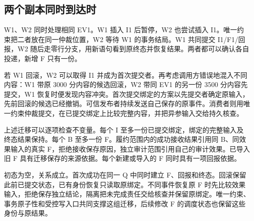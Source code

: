 
\subsection*{两个副本同时到达时}

W1、W2 同时处理相同 EV1。W1 插入 I1 后暂停，W2 也尝试插入 I1。唯一约束把二者放在同一仲裁位置，W2 等待 W1 的事务结局。W1 共同提交 I1/F1/回报，W2 随后走零行分支，用新语句看到原终态并恢复结果。两者都可以确认各自投递，新增 F 只有一份。

若 W1 回滚，W2 可以取得 I1 并成为首次提交者。再考虑调用方错误地混入不同内容：W1 带原 3000 分内容的候选回滚，W2 带同 EV1 的另一份 3500 分内容先提交，W1 恢复时便发现内容冲突。首次提交绑定的方案以先提交者确定原输入，先前回滚的候选已经撤销。可信发布者持续发送自己保存的原事件。消费者则用唯一约束仲裁提交，在已提交绑定上比较完整内容，并把异参输入交给持久核查。


上述迁移可以逐项检查不变量。每个 I 至多一份已提交绑定，绑定的完整输入及终态结果保持。每个 B 至多一份 F。履约范围内的成功接收结果引用同 B、同效果输入的真实 F，拒绝接收保存原因，独立审计范围引用自己的审计效果。已导入旧 F 具有迁移保存的来源依据。每个新建或导入的 F 同时具有一项回报依据。

初态为空，关系成立。首次成功在同一 Q 中同时建立 F、回报和终态。回滚保留此前已提交状态，已有身份恢复只读取原绑定。不同事件恢复原 F 时先比较效果输入，拒绝保存独立结论，隔离把未完成责任交给核查并保留原绑定。唯一约束、事务原子性和受控写入口共同支撑这组迁移，后续修改 F 的调度状态也保留这些身份与原结果。
